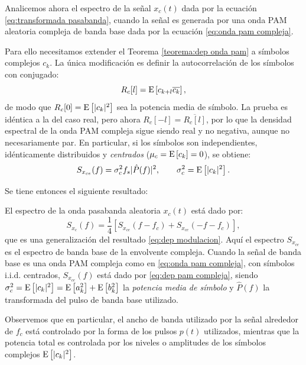 Analicemos ahora el espectro de la señal $x_c(t)$ dada por la ecuación \eqref{eq:transformada pasabanda}, cuando la señal es generada por una onda PAM aleatoria compleja de banda base dada por la ecuación \eqref{eq:onda pam compleja}.

Para ello necesitamos extender el Teorema \ref{teorema:dep onda pam} a símbolos complejos $c_k$. La única modificación es definir la autocorrelación de los símbolos con conjugado:
\begin{equation*}
    R_c[l] = \mathrm{E}\left[c_{k+l}\overline{c_k}\right],
\end{equation*}
de modo que $R_c[0]=\mathrm{E}\left[|c_k|^2\right]$ sea la potencia media de símbolo. La prueba es idéntica a la del caso real, pero ahora $R_c[-l]=\overline{R_c[l]}$, por lo que la densidad espectral de la onda PAM compleja sigue siendo real y no negativa, aunque no necesariamente par. En particular, si los símbolos son independientes, idénticamente distribuidos y \emph{centrados} ($\mu_c=\mathrm{E}\left[c_k\right]=0$), se obtiene:
\begin{equation}\label{eq:dep pam compleja}
    S_{x_{ce}}(f) = \sigma_c^2 f_s |\hat{P}(f)|^2, \qquad \sigma_c^2=\mathrm{E}\left[|c_k|^2\right].
\end{equation}

Se tiene entonces el siguiente resultado:

\begin{teorema}\label{thm:espectro pasabanda}
    El espectro de la onda pasabanda aleatoria $x_c(t)$ está dado por:
    \begin{equation*}
        S_{x_c}(f) = \frac{1}{4}\left[S_{x_{ce}}(f-f_c) + S_{x_{ce}}(-f-f_c)\right],
    \end{equation*}
    que es una generalización del resultado \eqref{eq:dep modulacion}. Aquí el espectro $S_{x_{ce}}$ es el espectro de banda base de la envolvente compleja. Cuando la señal de banda base es una onda PAM compleja como en \eqref{eq:onda pam compleja}, con símbolos i.i.d. centrados, $S_{x_{ce}}(f)$ está dado por \eqref{eq:dep pam compleja}, siendo $\sigma_c^2 = \mathrm{E}\left[|c_k|^2\right] = \mathrm{E}\left[a_k^2\right]+\mathrm{E}\left[b_k^2\right]$ la \emph{potencia media de símbolo} y $\hat{P}(f)$ la transformada del pulso de banda base utilizado.
\end{teorema}

Observemos que en particular, el ancho de banda utilizado por la señal alrededor de $f_c$ está controlado por la forma de los pulsos $p(t)$ utilizados, mientras que la potencia total es controlada por los niveles o amplitudes de los símbolos complejos $\mathrm{E}\left[|c_k|^2\right]$.

